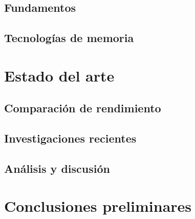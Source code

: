 \documentclass[12pt]{article}
\begin{document}
\subsection{Fundamentos}


\subsection{Tecnologías de memoria}


\section{Estado del arte}

\subsection{Comparación de rendimiento}


\subsection{Investigaciones recientes}


\subsection{Análisis y discusión}


\section{Conclusiones preliminares}


\renewcommand{\refname}{Referencias bibliográficas}



\end{document}
